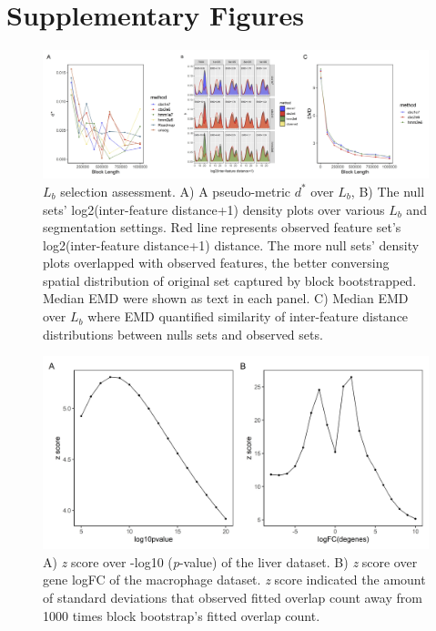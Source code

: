 \documentclass{article}
\begin{document}
\section{Supplementary Figures}
\begin{figure}[htbp]
\centering
\includegraphics[scale=0.35]{Figures/sfig1.jpeg}
\caption{$L_b$ selection assessment. A) A pseudo-metric $d^*$ over $L_b$, B) The null sets' log2(inter-feature distance+1) density plots over various $L_b$ and segmentation settings. Red line represents observed feature set's log2(inter-feature distance+1) distance. The more null sets' density plots overlapped with observed features, the better conversing spatial distribution of original set captured by block bootstrapped. Median EMD were shown as text in each panel. C) Median EMD over $L_b$ where EMD quantified similarity of inter-feature distance distributions between nulls sets and observed sets.} 
\label{fig:suppfig0}
\end{figure}

\begin{figure}[htbp]
\centering
\includegraphics[scale=0.3]{Figures/zscore.jpeg}
\caption{ A) \textit{z} score over -log10 (\textit{p}-value) of the liver dataset. B) \textit{z} score over gene logFC of the macrophage dataset. \textit{z} score indicated the amount of standard deviations that observed fitted overlap count away from 1000 times block bootstrap's fitted overlap count.} 
\label{fig:suppfig2}
\end{figure}
\end{document}
